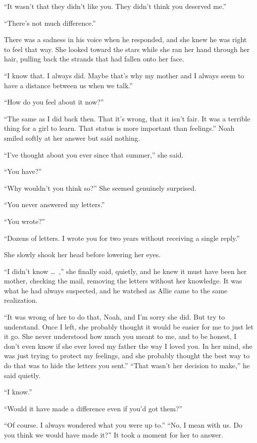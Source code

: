 \documentclass[10pt, twoside, openright]{book}
\begin{document}
``It wasn't that they didn't like you. They didn't think you deserved
me.''

``There's not much difference.''


There was a sadness in his voice when he responded, and she knew he was
right to feel that way. She looked toward the stars while she ran her
hand through her hair, pulling back the strands that had fallen onto her
face.

``I know that. I always did. Maybe that's why my mother and I always
seem to have a distance between us when we talk.''


``How do you feel about it now?''


``The same as I did back then. That it's wrong, that it isn't fair. It
was a terrible thing for a girl to learn. That status is more important
than feelings.'' Noah smiled softly at her answer but said nothing.


``I've thought about you ever since that summer,'' she said.

``You have?''

``Why wouldn't you think so?'' She seemed genuinely surprised.

``You never answered my letters.''

``You wrote?''


``Dozens of letters. I wrote you for two years without receiving a
single reply.''


She slowly shook her head before lowering her eyes.


``I didn't know   \dots\ ,'' she finally said, quietly, and he knew it must
have been her mother, checking the mail, removing the letters without
her knowledge. It was what he had always suspected, and he watched as
Allie came to the same realization.

``It was wrong of her to do that, Noah, and I'm sorry she did. But try
to understand. Once I left, she probably thought it would be easier for
me to just let it go. She never understood how much you meant to me, and
to be honest, I don't even know if she ever loved my father the way I
loved you. In her mind, she was just trying to protect my feelings, and
she probably thought the best way to do that was to hide the letters you
sent.'' ``That wasn't her decision to make,'' he said quietly.


``I know.''

``Would it have made a difference even if you'd got them?''

``Of course. I always wondered what you were up to.'' ``No, I mean with
us. Do you think we would have made it?'' It took a moment for her to
answer.
\end{document}
